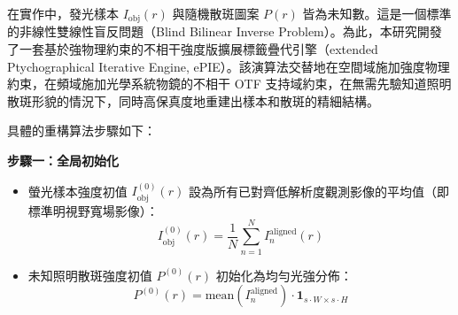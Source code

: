 在實作中，發光樣本 $I_{\text{obj}}(r)$ 與隨機散斑圖案 $P(r)$ 皆為未知數。這是一個標準的非線性雙線性盲反問題（Blind Bilinear Inverse Problem）。為此，本研究開發了一套基於強物理約束的不相干強度版擴展標籤疊代引擎（extended Ptychographical Iterative Engine, ePIE）。該演算法交替地在空間域施加強度物理約束，在頻域施加光學系統物鏡的不相干 OTF 支持域約束，在無需先驗知道照明散斑形貌的情況下，同時高保真度地重建出樣本和散斑的精細結構。

具體的重構算法步驟如下：

\textbf{步驟一：全局初始化}
\begin{itemize}
    \item 螢光樣本強度初值 $I_{\text{obj}}^{(0)}(r)$ 設為所有已對齊低解析度觀測影像的平均值（即標準明視野寬場影像）：
    \begin{equation}
        I_{\text{obj}}^{(0)}(r) = \frac{1}{N} \sum_{n=1}^N I_n^{\text{aligned}}(r)
    \end{equation}
    \item 未知照明散斑強度初值 $P^{(0)}(r)$ 初始化為均勻光強分佈：
    \begin{equation}
        P^{(0)}(r) = \text{mean}(I_n^{\text{aligned}}) \cdot \mathbf{1}_{s\cdot W \times s\cdot H}
    \end{equation}
\end{itemize}

